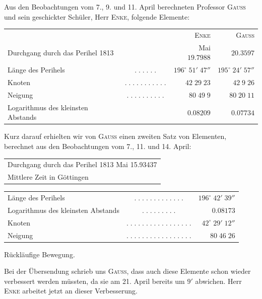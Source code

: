 \par\indent Aus den Beobachtungen vom 7., 9. und 11. April berechneten Professor \textsc{Gauss} und sein geschickter Schüler, Herr \textsc{Enke}, folgende Elemente:

\begin{center}\fontsize{9}{11}\selectfont\setlength{\tabcolsep}{5pt}\renewcommand{\arraystretch}{1.15}\begin{tabular}{lcrr}
& & \textsc{Enke} & \textsc{Gauss}\\
Durchgang durch das Perihel 1813 & & Mai $19.7988$ & $20.3597$\\
Länge des Perihels & $.\;.\;.\;.\;.\;.$ & $196^\circ\;51'\;47''$ & $195^\circ\;24'\;57''$\\
Knoten & $.\;.\;.\;.\;.\;.\;.\;.\;.\;.\;.$ & $42\;29\;23$ & $42\;9\;26$\\
Neigung & $.\;.\;.\;.\;.\;.\;.\;.\;.\;.$ & $80\;49\;9$ & $80\;20\;11$\\
Logarithmus des kleinsten Abstands &  & $0.08209$ & $0.07734$\\
\end{tabular}\end{center}

\par\indent Kurz darauf erhielten wir von \textsc{Gauss} einen zweiten Satz von Elementen, berechnet aus den Beobachtungen vom 7., 11. und 14. April:

\begin{center}\fontsize{10}{12}\selectfont\setlength{\tabcolsep}{2pt}\renewcommand{\arraystretch}{1.15}\begin{tabular}{l}
Durchgang durch das Perihel 1813 Mai 15.93437\\Mittlere Zeit in Göttingen\\
\end{tabular}\end{center}\begin{center}\fontsize{10}{12}\selectfont\setlength{\tabcolsep}{2pt}\renewcommand{\arraystretch}{1.15}\begin{tabular}{lcr}
Länge des Perihels & $.\;.\;.\;.\;.\;.\;.\;.\;.\;.\;.\;.\;.$ & $196^\circ\;42'\;39''$\\
Logarithmus des kleinsten Abstands & $.\;.\;.\;.\;.\;.\;.\;.\;.$ & $0.08173$\\
Knoten & $.\;.\;.\;.\;.\;.\;.\;.\;.\;.\;.\;.\;.\;.\;.\;.\;.$ & $42^\circ\;29'\;12''$\\
Neigung & $.\;.\;.\;.\;.\;.\;.\;.\;.\;.\;.\;.\;.\;.\;.\;.\;.$ & $80\;46\;26$\\
\end{tabular}\end{center}

\noindent Rückläufige Bewegung.

\par\indent Bei der Übersendung schrieb uns \textsc{Gauss}, dass auch diese Elemente schon wieder verbessert werden müssten, da sie am 21. April bereits um $9'$ abwichen. Herr \textsc{Enke} arbeitet jetzt an dieser Verbesserung.
